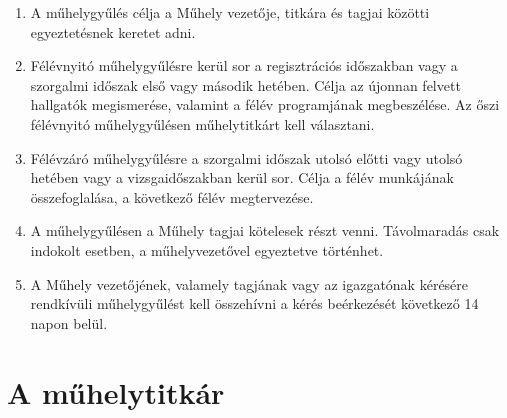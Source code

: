 \documentclass{../styles/rulebook}
\begin{document}
\begin{enumerate}
	\item A műhelygyűlés célja a Műhely vezetője, titkára és tagjai közötti egyeztetésnek keretet adni.
	\item Félévnyitó műhelygyűlésre kerül sor a regisztrációs időszakban vagy a szorgalmi időszak első vagy második hetében. Célja az újonnan felvett hallgatók megismerése, valamint a félév programjának megbeszélése. Az őszi félévnyitó műhelygyűlésen műhelytitkárt kell választani.
	\item Félévzáró műhelygyűlésre a szorgalmi időszak utolsó előtti vagy utolsó hetében vagy a vizsgaidőszakban kerül sor. Célja a félév munkájának összefoglalása, a következő félév megtervezése.
	\item A műhelygyűlésen a Műhely tagjai kötelesek részt venni. Távolmaradás csak indokolt esetben, a műhelyvezetővel egyeztetve történhet.
	\item A Műhely vezetőjének, valamely tagjának vagy az igazgatónak kérésére rendkívüli műhelygyűlést kell összehívni a kérés beérkezését következő 14 napon belül. \label{bek:rendkivuliMuhelygyules}
\end{enumerate}

\section{A műhelytitkár}
\end{document}
